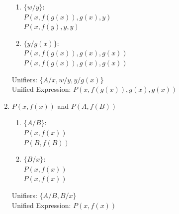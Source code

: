\documentclass[12pt]{article}
\begin{document}
\begin{enumerate}
\begin{enumerate}
              \item $\{w/y\}$:\\
                    $P(x,f(g(x)),g(x),y)$\\
                    $P(x,f(y),y,y)$

              \item $\{y/g(x)\}$:\\
                    $P(x,f(g(x)),g(x),g(x))$\\
                    $P(x,f(g(x)),g(x),g(x))$
          \end{enumerate}

          \noindent
          Unifiers: $\{A/x,w/y,y/g(x)\}$\\
          Unified Expression: $P(x,f(g(x)),g(x),g(x))$

    \item $P(x,f(x))$ and $P(A,f(B))$
          \begin{enumerate}[(1)]
              \item $\{A/B\}$:\\
                    $P(x,f(x))$\\
                    $P(B,f(B))$

              \item $\{B/x\}$:\\
                    $P(x,f(x))$\\
                    $P(x,f(x))$
          \end{enumerate}

          \noindent
          Unifiers: $\{A/B,B/x\}$\\
          Unified Expression: $P(x,f(x))$
\end{enumerate}
\end{document}
